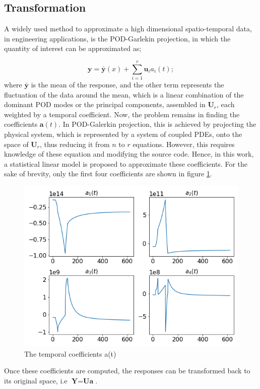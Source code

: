 \documentclass{anstrans}
\begin{document}
\subsection{Transformation}

A widely used method to approximate a high dimensional spatio-temporal data, in engineering applications, is the POD-Garlekin projection, in which the quantity of interest can be approximated as; 

\begin{equation}
\textbf{y} = \bar{\textbf{y}}(x) + \sum_{i=1}^r \textbf{u}_i a_i(t);
\label{pod-galerkin}
\end{equation}
where $\bar{\textbf{y}}$ is the mean of the response, and the other term represents the fluctuation of the data around the mean, which is a linear combination of the dominant POD modes or the principal components, assembled in $\textbf{U}_r$, each weighted by a temporal coefficient.
Now, the problem remains in finding the coefficients $\textbf{a}(t)$.
In POD-Galerkin projection, this is achieved by projecting the physical system, which is represented by a system of coupled PDEs, onto the space of $\textbf{U}_r$, thus reducing it from $n$ to $r$ equations.
However, this requires knowledge of these equation and modifying the source code.
Hence, in this work, a statistical linear model is proposed to approximate these coefficients. For the sake of brevity, only the first four coefficients are shown in figure \ref{fig:coeffs}.\\
\begin{figure}[!h]
	\centering
	\includegraphics[scale=0.4]{./figs/temp_coeff.png}
	\caption{The temporal coefficients a(t)}
	\label{fig:coeffs}
\end{figure}
Once these coefficients are computed, the responses can be transformed back to its original space, i.e $\textbf{Y} = \textbf{U} \textbf{a}$.
\end{document}
